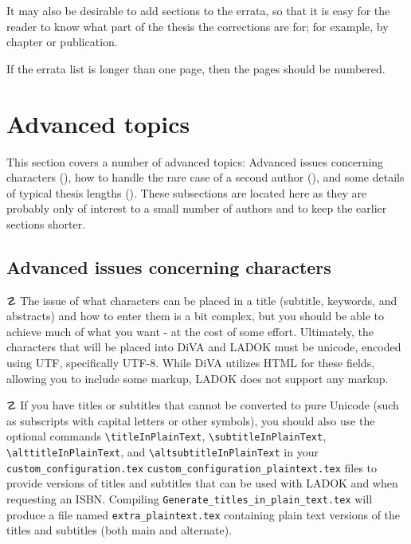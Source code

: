 \documentclass[12pt, twoside]{article}
\newcommand{\fname}[1]{\texttt{#1}}
\begin{document}
It may also be desirable to add sections to the errata, so that it is easy for the reader to know what part of the thesis the corrections are for; for example, by chapter or publication.

If the errata list is longer than one page, then the pages should be numbered.

\section{Advanced topics}
\label{sec:advancedTopics}

This section covers a number of advanced topics: Advanced issues concerning characters (), how to handle the rare case of a second author (), and some details of typical thesis lengths (). These subsections are located here as they are probably only of interest to a small number of authors and to keep the earlier sections shorter.

\subsection{Advanced issues concerning characters}
\label{sec:advancedIssuesConcerningCharacters}
\noindent $☡$ The issue of what characters can be placed in a title (subtitle, keywords, and abstracts) and how to enter them is a bit complex, but you should be able to achieve much of what you want - at the cost of some effort.
Ultimately, the characters that will be placed into \gls{DiVA} and \gls{LADOK} must be unicode, encoded using \gls{UTF}, specifically UTF-8. While \gls{DiVA} utilizes \gls{HTML} for these fields, allowing you to include some markup, \gls{LADOK} does not support any markup.

\noindent $☡$ If you have titles or subtitles that cannot be converted to pure Unicode (such as subscripts with capital letters or other symbols), you should also use the optional commands \texttt{\textbackslash titleInPlainText}, \texttt{\textbackslash subtitleInPlainText}, \texttt{\textbackslash alttitleInPlainText}, and \texttt{\textbackslash altsubtitleInPlainText} in your \fname{custom\_configuration.tex}  \fname{custom\_configuration\_plaintext.tex} files to provide versions of titles and subtitles that can be used with \gls{LADOK} and when requesting an \gls{ISBN}. Compiling \fname{Generate\_titles\_in\_plain\_text.tex} will produce a file named \fname{extra\_plaintext.tex} containing plain text versions of the \mbox{titles} and subtitles (both main and alternate).
\end{document}
